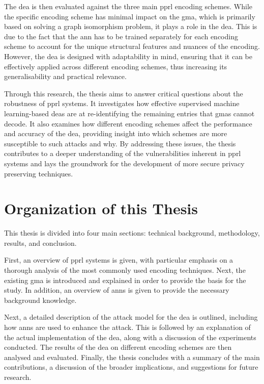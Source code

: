The \ac{dea} is then evaluated against the three main \ac{pprl} encoding schemes.
While the specific encoding scheme has minimal impact on the \ac{gma}, which is primarily based on solving a graph isomorphism problem, it plays a role in the \ac{dea}.
This is due to the fact that the \ac{ann} has to be trained separately for each encoding scheme to account for the unique structural features and nuances of the encoding.
However, the \ac{dea} is designed with adaptability in mind, ensuring that it can be effectively applied across different encoding schemes, thus increasing its generalisability and practical relevance.

Through this research, the thesis aims to answer critical questions about the robustness of \ac{pprl} systems.
It investigates how effective supervised machine learning-based \ac{dea}s are at re-identifying the remaining entries that \ac{gma}s cannot decode.
It also examines how different encoding schemes affect the performance and accuracy of the \ac{dea}, providing insight into which schemes are more susceptible to such attacks and why.
By addressing these issues, the thesis contributes to a deeper understanding of the vulnerabilities inherent in \ac{pprl} systems and lays the groundwork for the development of more secure privacy preserving techniques.

\section{Organization of this Thesis}  \label{sec:orga}

This thesis is divided into four main sections: technical background, methodology, results, and conclusion.

First, an overview of \ac{pprl} systems is given, with particular emphasis on a thorough analysis of the most commonly used encoding techniques.
Next, the existing \ac{gma} is introduced and explained in order to provide the basis for the study.
In addition, an overview of \ac{ann}s is given to provide the necessary background knowledge.

Next, a detailed description of the attack model for the \ac{dea} is outlined, including how \ac{ann}s are used to enhance the attack.
This is followed by an explanation of the actual implementation of the \ac{dea}, along with a discussion of the experiments conducted.
The results of the \ac{dea} on different encoding schemes are then analysed and evaluated.
Finally, the thesis concludes with a summary of the main contributions, a discussion of the broader implications, and suggestions for future research.